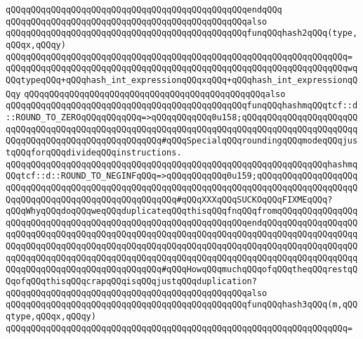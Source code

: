 \verb|qQQqqQQqqQQqqQQqqQQqqQQqqQQqqQQqqQQqqQQqqQQqqQQqendqQQq|\newline
\newline
\verb|qQQqqQQqqQQqqQQqqQQqqQQqqQQqqQQqqQQqqQQqqQQqqQQqalso|\newline
\verb|qQQqqQQqqQQqqQQqqQQqqQQqqQQqqQQqqQQqqQQqqQQqqQQqfunqQQqhash2qQQq(type,qQQqx,qQQqy)|\newline
\verb|qQQqqQQqqQQqqQQqqQQqqQQqqQQqqQQqqQQqqQQqqQQqqQQqqQQqqQQqqQQqqQQqqQQq=|\newline
\verb|qQQqqQQqqQQqqQQqqQQqqQQqqQQqqQQqqQQqqQQqqQQqqQQqqQQqqQQqqQQqqQQqqQQqwqQQqtypeqQQq+qQQqhash_int_expressionqQQqxqQQq+qQQqhash_int_expressionqQQqy|\newline
\newline
\verb|qQQqqQQqqQQqqQQqqQQqqQQqqQQqqQQqqQQqqQQqqQQqqQQqalso|\newline
\verb|qQQqqQQqqQQqqQQqqQQqqQQqqQQqqQQqqQQqqQQqqQQqqQQqfunqQQqhashmqQQqtcf::d::ROUND_TO_ZEROqQQqqQQqqQQq=>qQQqqQQqqQQq0u158;qQQqqQQqqQQqqQQqqQQqqQQqqQQqqQQqqQQqqQQqqQQqqQQqqQQqqQQqqQQqqQQqqQQqqQQqqQQqqQQqqQQqqQQqqQQqqQQqqQQqqQQqqQQqqQQqqQQqqQQqqQQq#qQQqSpecialqQQqroundingqQQqmodeqQQqjustqQQqforqQQqdivideqQQqinstructions.|\newline
\verb|qQQqqQQqqQQqqQQqqQQqqQQqqQQqqQQqqQQqqQQqqQQqqQQqqQQqqQQqqQQqqQQqhashmqQQqtcf::d::ROUND_TO_NEGINFqQQq=>qQQqqQQqqQQq0u159;qQQqqQQqqQQqqQQqqQQqqQQqqQQqqQQqqQQqqQQqqQQqqQQqqQQqqQQqqQQqqQQqqQQqqQQqqQQqqQQqqQQqqQQqqQQqqQQqqQQqqQQqqQQqqQQqqQQqqQQqqQQq#qQQqXXXqQQqSUCKOqQQqFIXMEqQQq?qQQqWhyqQQqdoqQQqweqQQqduplicateqQQqthisqQQqfnqQQqfromqQQqqQQqqQQqqQQq|\newline
\verb|qQQqqQQqqQQqqQQqqQQqqQQqqQQqqQQqqQQqqQQqqQQqqQQqendqQQqqQQqqQQqqQQqqQQqqQQqqQQqqQQqqQQqqQQqqQQqqQQqqQQqqQQqqQQqqQQqqQQqqQQqqQQqqQQqqQQqqQQqqQQqqQQqqQQqqQQqqQQqqQQqqQQqqQQqqQQqqQQqqQQqqQQqqQQqqQQqqQQqqQQqqQQqqQQqqQQqqQQqqQQqqQQqqQQqqQQqqQQqqQQqqQQqqQQqqQQqqQQqqQQqqQQqqQQqqQQqqQQqqQQqqQQqqQQqqQQqqQQqqQQqqQQqqQQq#qQQqHowqQQqmuchqQQqofqQQqtheqQQqrestqQQqofqQQqthisqQQqcrapqQQqisqQQqjustqQQqduplication?|\newline
\newline
\verb|qQQqqQQqqQQqqQQqqQQqqQQqqQQqqQQqqQQqqQQqqQQqqQQqalso|\newline
\verb|qQQqqQQqqQQqqQQqqQQqqQQqqQQqqQQqqQQqqQQqqQQqqQQqfunqQQqhash3qQQq(m,qQQqtype,qQQqx,qQQqy)|\newline
\verb|qQQqqQQqqQQqqQQqqQQqqQQqqQQqqQQqqQQqqQQqqQQqqQQqqQQqqQQqqQQqqQQqqQQq=|\newline
